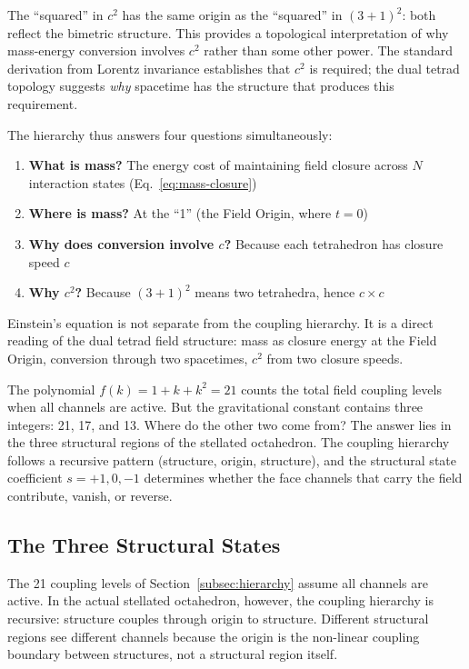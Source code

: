 \documentclass[aps,prd,preprint,superscriptaddress,showpacs,preprintnumbers,amsmath,amssymb,nofootinbib]{revtex4-2}
\begin{document}
The ``squared'' in $c^2$ has the same origin as the ``squared'' in $(3+1)^2$: both reflect the bimetric structure. This provides a topological interpretation of why mass-energy conversion involves $c^2$ rather than some other power. The standard derivation from Lorentz invariance establishes that $c^2$ is required; the dual tetrad topology suggests \emph{why} spacetime has the structure that produces this requirement.

The hierarchy thus answers four questions simultaneously:
\begin{enumerate}
\item \textbf{What is mass?} The energy cost of maintaining field closure across $N$ interaction states (Eq.~\ref{eq:mass-closure})
\item \textbf{Where is mass?} At the ``1'' (the Field Origin, where $t = 0$)
\item \textbf{Why does conversion involve $c$?} Because each tetrahedron has closure speed $c$
\item \textbf{Why $c^2$?} Because $(3+1)^2$ means two tetrahedra, hence $c \times c$
\end{enumerate}

Einstein's equation is not separate from the coupling hierarchy. It is a direct reading of the dual tetrad field structure: mass as closure energy at the Field Origin, conversion through two spacetimes, $c^2$ from two closure speeds.

The polynomial $f(k) = 1 + k + k^2 = 21$ counts the total field coupling levels when all channels are active. But the gravitational constant contains three integers: 21, 17, and 13. Where do the other two come from? The answer lies in the three structural regions of the stellated octahedron. The coupling hierarchy follows a recursive pattern (structure, origin, structure), and the structural state coefficient $s = +1, 0, -1$ determines whether the face channels that carry the field contribute, vanish, or reverse.

\subsection{The Three Structural States}
\label{subsec:states}

The 21 coupling levels of Section~\ref{subsec:hierarchy} assume all channels are active. In the actual stellated octahedron, however, the coupling hierarchy is recursive: structure couples through origin to structure. Different structural regions see different channels because the origin is the non-linear coupling boundary between structures, not a structural region itself.
\end{document}
